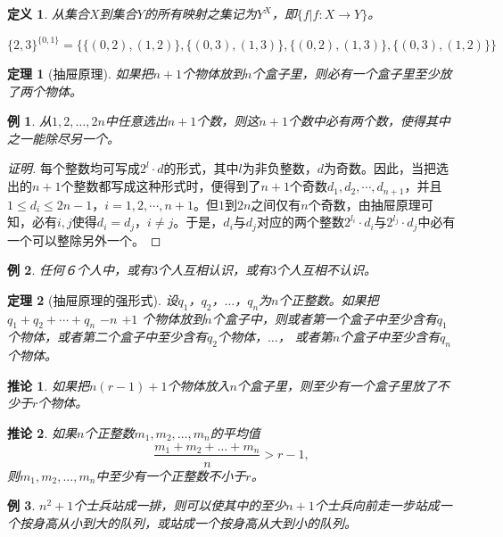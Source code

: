 \documentclass{book}[oneside]
\newtheorem{Def}{定义}[chapter]
\newtheorem{Thm}{定理}[chapter]
\newtheorem{Cor}{推论}[chapter]
\newtheorem*{Example}{例}
\begin{document}
\begin{CJK*}{UTF8}{gbsn}

  \begin{Def}
    从集合$X$到集合$Y$的所有映射之集记为$Y^X$，即$\{f|f:X\to Y\}$。
  \end{Def}

  
$\{2,3\}^{\{0,1\}} = \{\{(0,2),(1,2)\},\{(0,3),(1,3)\},\{(0,2),(1,3)\},\{(0,3),(1,2)\}\}$

    \begin{Thm}[抽屉原理]
    如果把$n+1$个物体放到$n$个盒子里，则必有一个盒子里至少放了两个物体。
  \end{Thm}
  \begin{Example}
    从$1,2,\ldots, 2n$中任意选出$n+1$个数，则这$n+1$个数中必有两个数，使得其中之一能除尽另一个。
  \end{Example}
  \begin{proof}[证明]
  每个整数均可写成$2^l\cdot d$的形式，其中$l$为非负整数，$d$为奇数。因此，当把选出的$n+1$个整数都写成这种形式时，便得到了$n+1$个奇数$d_1,d_2,\cdots, d_{n+1}$，并且$1\leq d_i \leq 2n -1$，$i=1,2,\cdots, n+1$。但$1$到$2n$之间仅有$n$个奇数，由抽屉原理可知，必有$i,j$使得$d_i=d_j$，$i\neq j$。于是，$d_i$与$d_j$对应的两个整数$2^{l_i}\cdot {d_i}$与$2^{l_j}\cdot {d_j}$中必有一个可以整除另外一个。
  \end{proof}

 \begin{Example}
    任何６个人中，或有$3$个人互相认识，或有$3$个人互相不认识。
  \end{Example}

    \begin{Thm}[抽屉原理的强形式]
    设$q_1$，$q_2$，$\ldots$，$q_n$为$n$个正整数。如果把 $q_1 + q_2 + \cdots + q_n$  $- n$ $ + 1$ 个物体放到$n$个盒子中，则或者第一个盒子中至少含有$q_1$个物体，或者第二个盒子中至少含有$q_2$个物体，$\ldots$，
    或者第$n$个盒子中至少含有$q_n$个物体。
  \end{Thm}
  \begin{Cor}
    如果把$n(r-1) + 1$个物体放入$n$个盒子里，则至少有一个盒子里放了不少于$r$个物体。
  \end{Cor}
  \begin{Cor}
    如果$n$个正整数$m_1, m_2, \ldots, m_n$的平均值\[\frac{m_1 + m_2 + \ldots + m_n}{n} > r - 1,\] 则$m_1, m_2, \ldots, m_n$中至少有一个正整数不小于$r$。
  \end{Cor}
 
  \begin{Example}
    $n^2+1$个士兵站成一排，则可以使其中的至少$n+1$个士兵向前走一步站成一个按身高从小到大的队列，或站成一个按身高从大到小的队列。
  \end{Example}


\end{CJK*}
\end{document}

